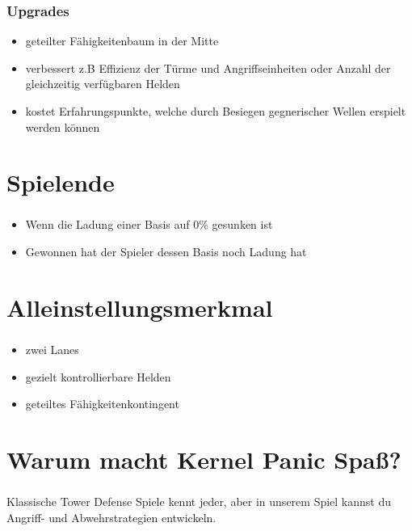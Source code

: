 \documentclass{beamer}
\begin{document}
\begin{frame}
\frametitle{Upgrades}
\begin{itemize}
\item geteilter Fähigkeitenbaum in der Mitte
\item verbessert z.B Effizienz der Türme und Angriffseinheiten oder Anzahl der gleichzeitig verfügbaren Helden
\item kostet Erfahrungspunkte, welche durch Besiegen gegnerischer Wellen erspielt werden können
\end{itemize}
\end{frame}

\section{Spielende}
\begin{frame}
\frametitle{\secname}
\begin{itemize}
\item Wenn die Ladung einer Basis auf 0\% gesunken ist
\item Gewonnen hat der Spieler dessen Basis noch Ladung hat
\end{itemize}
\end{frame}

\section{Alleinstellungsmerkmal}
\begin{frame}
\frametitle{\secname}
\begin{itemize}
\item zwei Lanes
\item gezielt kontrollierbare Helden
\item geteiltes Fähigkeitenkontingent
\end{itemize}
\end{frame}

\section{Warum macht Kernel Panic Spaß?}
\begin{frame}
\frametitle{\secname}
Klassische Tower Defense Spiele kennt jeder, aber in unserem Spiel kannst du Angriff- und Abwehrstrategien entwickeln.
\end{frame}
\end{document}
